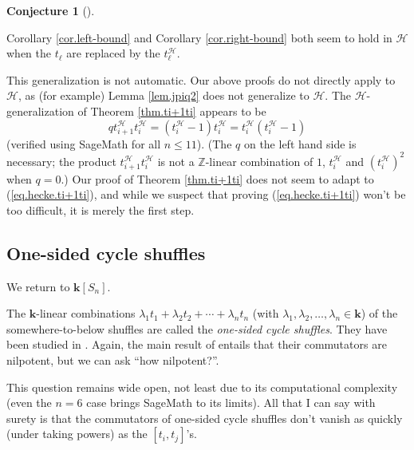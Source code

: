 \documentclass[numbers=enddot,12pt,final,onecolumn,notitlepage]{scrartcl}%
\theoremstyle{definition}
\newtheorem{conj}[theo]{Conjecture}
\newenvironment{conjecture}[1][]
{\begin{conj}[#1]\begin{leftbar}}
{\end{leftbar}\end{conj}}
\begin{document}
\begin{conjecture}
Corollary \ref{cor.left-bound} and Corollary \ref{cor.right-bound} both seem
to hold in $\mathcal{H}$ when the $t_{\ell}$ are replaced by the $t_{\ell
}^{\mathcal{H}}$.
\end{conjecture}

This generalization is not automatic. Our above proofs do not directly apply
to $\mathcal{H}$, as (for example) Lemma \ref{lem.jpiq2} does not generalize
to $\mathcal{H}$. The $\mathcal{H}$-generalization of Theorem \ref{thm.ti+1ti}
appears to be%
\begin{equation}
qt_{i+1}^{\mathcal{H}}t_{i}^{\mathcal{H}}=\left(  t_{i}^{\mathcal{H}%
}-1\right)  t_{i}^{\mathcal{H}}=t_{i}^{\mathcal{H}}\left(  t_{i}^{\mathcal{H}%
}-1\right)  \label{eq.hecke.ti+1ti}%
\end{equation}
(verified using SageMath for all $n\leq11$). (The $q$ on the left hand side is
necessary; the product $t_{i+1}^{\mathcal{H}}t_{i}^{\mathcal{H}}$ is not a
$\mathbb{Z}$-linear combination of $1$, $t_{i}^{\mathcal{H}}$ and $\left(
t_{i}^{\mathcal{H}}\right)  ^{2}$ when $q=0$.) Our proof of Theorem
\ref{thm.ti+1ti} does not seem to adapt to (\ref{eq.hecke.ti+1ti}), and while
we suspect that proving (\ref{eq.hecke.ti+1ti}) won't be too difficult, it is
merely the first step.

\subsection{One-sided cycle shuffles}

We return to $\mathbf{k}\left[  S_{n}\right]  $.

The $\mathbf{k}$-linear combinations $\lambda_{1}t_{1}+\lambda_{2}t_{2}%
+\cdots+\lambda_{n}t_{n}$ (with $\lambda_{1},\lambda_{2},\ldots,\lambda_{n}%
\in\mathbf{k}$) of the somewhere-to-below shuffles are called the
\emph{one-sided cycle shuffles}. They have been studied in \cite{s2b1}. Again,
the main result of \cite{s2b1} entails that their commutators are nilpotent,
but we can ask \textquotedblleft how nilpotent?\textquotedblright.

This question remains wide open, not least due to its computational complexity
(even the $n=6$ case brings SageMath to its limits). All that I can say with
surety is that the commutators of one-sided cycle shuffles don't vanish as
quickly (under taking powers) as the $\left[  t_{i},t_{j}\right]  $'s.
\end{document}

